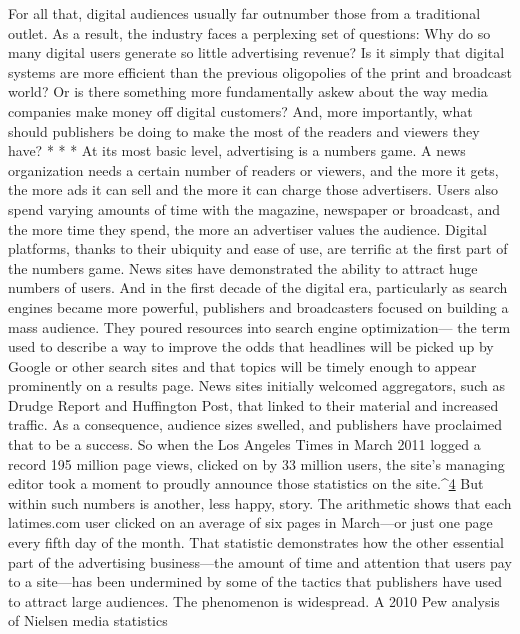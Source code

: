 For all that, digital audiences usually far outnumber those from a traditional
outlet. As a result, the industry faces a perplexing set of questions: Why do so
many digital users generate so little advertising revenue? Is it simply that digital
systems are more efficient than the previous oligopolies of the print and broadcast
world? Or is there something more fundamentally askew about the way
media companies make money off digital customers? And, more importantly,
what should publishers be doing to make the most of the readers and viewers
they have?
* * *
At its most basic level, advertising is a numbers game. A news organization
needs a certain number of readers or viewers, and the more it gets, the more ads
it can sell and the more it can charge those advertisers. Users also spend varying
amounts of time with the magazine, newspaper or broadcast, and the more time
they spend, the more an advertiser values the audience.
Digital platforms, thanks to their ubiquity and ease of use, are terrific at the
first part of the numbers game. News sites have demonstrated the ability to attract
huge numbers of users. And in the first decade of the digital era, particularly as
search engines became more powerful, publishers and broadcasters focused on
building a mass audience. They poured resources into search engine optimization—
the term used to describe a way to improve the odds that headlines will be
picked up by Google or other search sites and that topics will be timely enough
to appear prominently on a results page. News sites initially welcomed aggregators,
such as Drudge Report and Huffington Post, that linked to their material
and increased traffic.
As a consequence, audience sizes swelled, and publishers have proclaimed that
to be a success. So when the Los Angeles Times in March 2011 logged a record
195 million page views, clicked on by 33 million users, the site’s managing editor
took a moment to proudly announce those statistics on the site.^{\href{#endnotes-ch2}{4}}%
But within such numbers is another, less happy, story. The arithmetic shows
that each latimes.com user clicked on an average of six pages in March—or just
one page every fifth day of the month. That statistic demonstrates how the other
essential part of the advertising business—the amount of time and attention that
users pay to a site—has been undermined by some of the tactics that publishers
have used to attract large audiences.
The phenomenon is widespread. A 2010 Pew analysis of Nielsen media statistics
